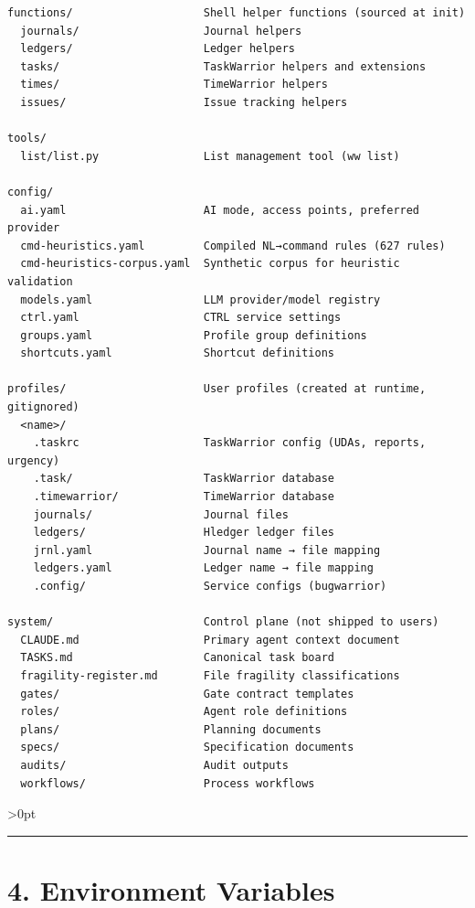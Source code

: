 \documentclass[11pt, a4paper, DIV=14]{scrartcl}
\let\origRule\rule
\renewcommand{\rule}[3][0pt]{%
  \ifnum\dimexpr#3\relax>0pt
    \par\vspace{2pt}\noindent{\color{BabbBorder}\origRule[#1]{#2}{#3}}\par\vspace{2pt}%
  \else
    \origRule[#1]{#2}{#3}%
  \fi
}
\begin{document}
\begin{verbatim}
functions/                    Shell helper functions (sourced at init)
  journals/                   Journal helpers
  ledgers/                    Ledger helpers
  tasks/                      TaskWarrior helpers and extensions
  times/                      TimeWarrior helpers
  issues/                     Issue tracking helpers

tools/
  list/list.py                List management tool (ww list)

config/
  ai.yaml                     AI mode, access points, preferred provider
  cmd-heuristics.yaml         Compiled NL→command rules (627 rules)
  cmd-heuristics-corpus.yaml  Synthetic corpus for heuristic validation
  models.yaml                 LLM provider/model registry
  ctrl.yaml                   CTRL service settings
  groups.yaml                 Profile group definitions
  shortcuts.yaml              Shortcut definitions

profiles/                     User profiles (created at runtime, gitignored)
  <name>/
    .taskrc                   TaskWarrior config (UDAs, reports, urgency)
    .task/                    TaskWarrior database
    .timewarrior/             TimeWarrior database
    journals/                 Journal files
    ledgers/                  Hledger ledger files
    jrnl.yaml                 Journal name → file mapping
    ledgers.yaml              Ledger name → file mapping
    .config/                  Service configs (bugwarrior)

system/                       Control plane (not shipped to users)
  CLAUDE.md                   Primary agent context document
  TASKS.md                    Canonical task board
  fragility-register.md       File fragility classifications
  gates/                      Gate contract templates
  roles/                      Agent role definitions
  plans/                      Planning documents
  specs/                      Specification documents
  audits/                     Audit outputs
  workflows/                  Process workflows
\end{verbatim}

\begin{center}\rule{0.5\linewidth}{0.5pt}\end{center}

\section{4. Environment Variables}\label{environment-variables}
\end{document}
